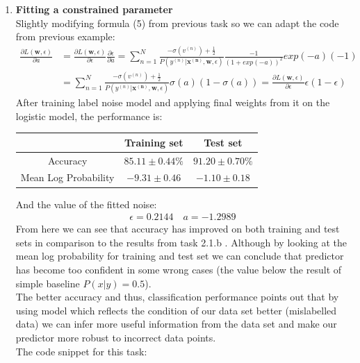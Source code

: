 \documentclass{article}
\newcommand{\vect}[1]{\boldsymbol{#1}} %
\begin{document}
\begin{enumerate}[label=(\alph*)]
					\item
						\textbf{Fitting a constrained parameter}\\
						Slightly modifying formula (5) from previous task so we can adapt the code from previous example:
						\begin{align*}
						\frac{\partial L(\vect{w}, \epsilon)}{\partial a} &=
						\frac{\partial L(\vect{w}, \epsilon)}{\partial \epsilon} 
						\frac{\partial \epsilon}{\partial a} =
						\sum_{n=1}^{N} 
							\frac 
								{-\sigma(v^{(n)}) + \frac{1}{2}} 
								{P(y^{(n)}|\vect{x^{(n)}}, \vect{w}, \epsilon)}		
							\frac{-1} {(1 + exp(-a))^2} exp(-a) (-1) 
						\\
						&=\sum_{n=1}^{N} 
								\frac 
									{-\sigma(v^{(n)}) + \frac{1}{2}} 
									{P(y^{(n)}|\vect{x^{(n)}}, \vect{w}, \epsilon)}		
							\sigma(a)(1 - \sigma(a))		=
							\frac{\partial L(\vect{w}, \epsilon)}{\partial \epsilon} 
							\epsilon (1 - \epsilon)				
						\end{align*}
						After training label noise model and applying final weights from it on the logistic model, the  performance is:
						\begin{center}
							\begin{tabular}{| c | c | c |}
								\hline
								\, & Training set & Test set \\
								\hline
								Accuracy & $85.11 \pm 0.44\%$ & $91.20 \pm 0.70\%$ \\
								\hline
								Mean Log Probability & $-9.31 \pm 0.46$ & $-1.10 \pm 0.18$\\
								\hline
							\end{tabular}
						\end{center}
						And the value of the fitted noise:
						\begin{align*}
							\epsilon =  0.2144 \quad a = -1.2989
						\end{align*}
						 From here we can see that accuracy has improved on both training and test sets in comparison to the results from task 2.1.b . Although by looking at the mean log probability for training and test set we can conclude that predictor has become too confident in some wrong cases (the value below the result of simple baseline $P(x|y)=0.5$).\\ The better accuracy and thus, classification performance points out that by using model which reflects the condition of  our data set better (mislabelled data) we can infer more useful information from the data set and make our predictor more robust to incorrect data points.\\
						 The code snippet for this task:
						 
				\end{enumerate}
				
\end{document}
